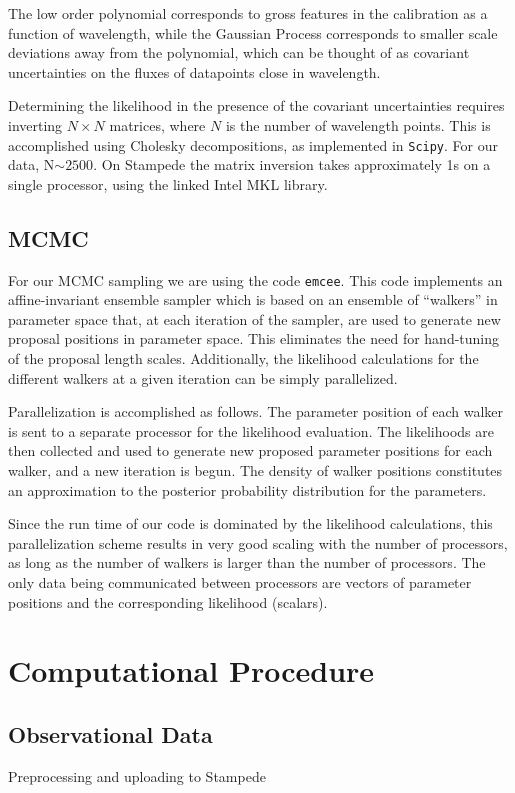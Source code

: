 \documentclass[11pt,preprint]{aastex}
\begin{document}
The low order polynomial corresponds to gross features in the
calibration as a function of wavelength, while the Gaussian Process
corresponds to smaller scale deviations away from the polynomial,
which can be thought of as covariant uncertainties on the fluxes of
datapoints close in wavelength.

Determining the likelihood in the presence of the covariant
uncertainties requires inverting $N \times N$ matrices, where $N$ is
the number of wavelength points.  This is accomplished using Cholesky
decompositions, as implemented in \texttt{Scipy}.  For our data,
N$\sim 2500$.  On Stampede the matrix inversion takes approximately 1s
on a single processor, using the linked Intel MKL library.

\subsection{MCMC}
For our MCMC sampling we are using the code \texttt{emcee}.  This code
implements an affine-invariant ensemble sampler \citep{goodman_weare}
which is based on an ensemble of ``walkers'' in parameter space that,
at each iteration of the sampler, are used to generate new proposal
positions in parameter space.  This eliminates the need for
hand-tuning of the proposal length scales.  Additionally, the
likelihood calculations for the different walkers at a given iteration
can be simply parallelized.

Parallelization is accomplished as follows. The parameter position of
each walker is sent to a separate processor for the likelihood
evaluation. The likelihoods are then collected and used to generate
new proposed parameter positions for each walker, and a new iteration
is begun.  The density of walker positions constitutes an
approximation to the posterior probability distribution for the
parameters.

Since the run time of our code is dominated by the likelihood
calculations, this parallelization scheme results in very good scaling
with the number of processors, as long as the number of walkers is
larger than the number of processors.  The only data being
communicated between processors are vectors of parameter positions and
the corresponding likelihood (scalars).


\section{Computational Procedure}

\subsection{Observational Data}
Preprocessing and uploading to Stampede
\end{document}
